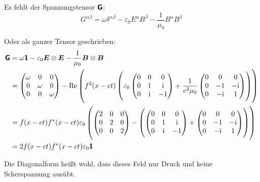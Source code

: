 Es fehlt der Spannungstensor $\boldsymbol{\mathsf{G}}$:
\[
	G^{\alpha\beta} =
	\omega \delta^{\alpha\beta} - \varepsilon_0 E^\alpha B^\beta
	- \frac{1}{\mu_0} B^\alpha B^\beta
\]

Oder als ganzer Tensor geschrieben:
\begin{align*}
	\tens G &= \omega \tens 1 - \varepsilon_0 \vec E \otimes \vec E
	- \frac{1}{\mu_0} \vec B \otimes \vec B \\
	&=
	\begin{pmatrix}
		\omega & 0 & 0 \\
				0 & \omega & 0 \\
		  0 & 0 & \omega
	\end{pmatrix}
	-
	\re\del{
		f^2(x-ct)
		\del{
			\varepsilon_0
			\begin{pmatrix}
				0 & 0 & 0 \\
		  0 & 1 & \ii \\
		  0 & \ii & -1
			\end{pmatrix}
			+
			\frac{1}{c^2 \mu_0}
			\begin{pmatrix}
				0 & 0 & 0 \\
		  0 & -1 & -\ii \\
		  0 & -\ii & 1
			\end{pmatrix}
		}
	} \\
	&=
	f(x-ct)f^*(x-ct) \varepsilon_0 \del{
		\begin{pmatrix}
			2 & 0 & 0 \\
			0 & 2 & 0 \\
			0 & 0 & 2
		\end{pmatrix}
		-
		\del{
			\begin{pmatrix}
				0 & 0 & 0 \\
		  0 & 1 & \ii \\
		  0 & \ii & -1
			\end{pmatrix}
			+
			\begin{pmatrix}
				0 & 0 & 0 \\
		  0 & -1 & -\ii \\
		  0 & -\ii & 1
			\end{pmatrix}
		}
	} \\
	&= 2 f(x-ct)f^*(x-ct) \varepsilon_0 \tens 1
\end{align*}

Die Diagonalform heißt wohl, dass dieses Feld nur Druck und keine Scherspannung
ausübt.


